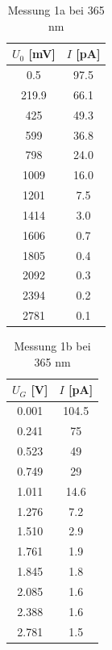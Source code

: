 \documentclass{article}
\begin{document}
\begin{table}[h!]
  \centering
  \begin{tabular}{|c|c|}
      \hline
      $U_0$ [mV] & $I$ [pA] \\
      \hline
      0.5   & 97.5 \\
      219.9 & 66.1 \\
      425   & 49.3 \\
      599   & 36.8 \\
      798   & 24.0 \\
      1009  & 16.0 \\
      1201  & 7.5  \\
      1414  & 3.0  \\
      1606  & 0.7  \\
      1805  & 0.4  \\
      2092  & 0.3  \\
      2394  & 0.2  \\
      2781  & 0.1  \\
      \hline
  \end{tabular}
  \caption{Messung 1a bei 365 nm}
  \label{tab:messung1a}
\end{table}

\begin{table}[h!]
  \centering
  \begin{tabular}{|c|c|}
      \hline
      $U_G$ [V] & $I$ [pA] \\
      \hline
      0.001  & 104.5 \\
      0.241  & 75    \\
      0.523  & 49    \\
      0.749  & 29    \\
      1.011  & 14.6  \\
      1.276  & 7.2   \\
      1.510  & 2.9   \\
      1.761  & 1.9   \\
      1.845  & 1.8   \\
      2.085  & 1.6   \\
      2.388  & 1.6   \\
      2.781  & 1.5   \\
      \hline
  \end{tabular}
  \caption{Messung 1b bei 365 nm}
  \label{tab:messung1b}
\end{table}
\end{document}
